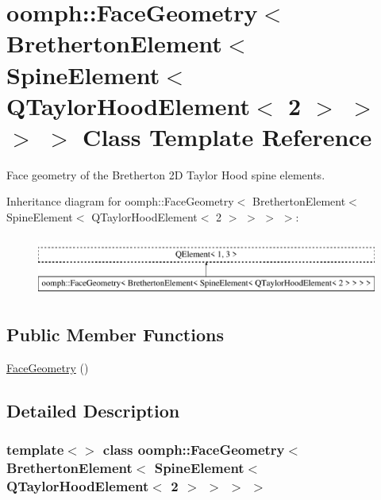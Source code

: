 \hypertarget{classoomph_1_1FaceGeometry_3_01BrethertonElement_3_01SpineElement_3_01QTaylorHoodElement_3_012_01_4_01_4_01_4_01_4}{}\section{oomph\+:\+:Face\+Geometry$<$ Bretherton\+Element$<$ Spine\+Element$<$ Q\+Taylor\+Hood\+Element$<$ 2 $>$ $>$ $>$ $>$ Class Template Reference}
\label{classoomph_1_1FaceGeometry_3_01BrethertonElement_3_01SpineElement_3_01QTaylorHoodElement_3_012_01_4_01_4_01_4_01_4}


Face geometry of the Bretherton 2D Taylor Hood spine elements.  


Inheritance diagram for oomph\+:\+:Face\+Geometry$<$ Bretherton\+Element$<$ Spine\+Element$<$ Q\+Taylor\+Hood\+Element$<$ 2 $>$ $>$ $>$ $>$\+:\begin{figure}[H]
\begin{center}
\leavevmode
\includegraphics[height=2.000000cm]{classoomph_1_1FaceGeometry_3_01BrethertonElement_3_01SpineElement_3_01QTaylorHoodElement_3_012_01_4_01_4_01_4_01_4}
\end{center}
\end{figure}
\subsection*{Public Member Functions}
\begin{DoxyCompactItemize}
\item 
\hyperlink{classoomph_1_1FaceGeometry_3_01BrethertonElement_3_01SpineElement_3_01QTaylorHoodElement_3_012_01_4_01_4_01_4_01_4_a7dd07e5dd24aaca5c44a36cfedb04c3e}{Face\+Geometry} ()
\end{DoxyCompactItemize}


\subsection{Detailed Description}
\subsubsection*{template$<$$>$\newline
class oomph\+::\+Face\+Geometry$<$ Bretherton\+Element$<$ Spine\+Element$<$ Q\+Taylor\+Hood\+Element$<$ 2 $>$ $>$ $>$ $>$}

